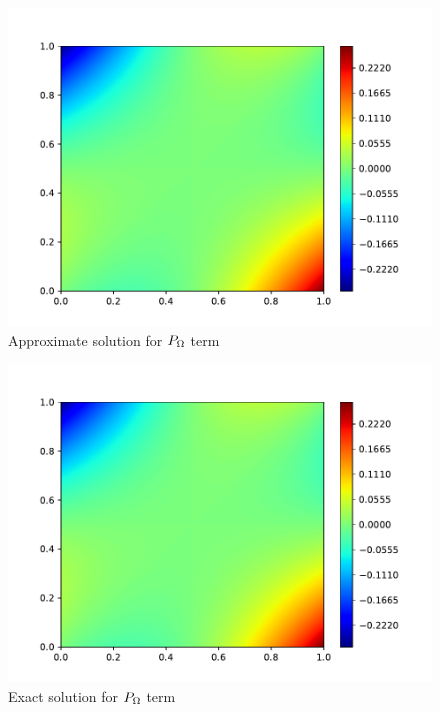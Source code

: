\begin{figure}[H]
    \includegraphics[height=0.4\textheight]{media/enstrophy-transport-terms/SGS-prod-approx.pdf}
    \caption{Approximate solution for $P_{\Omega}$ term}
    \label{fig:p-approx}
\end{figure}
\begin{figure}[H]
    \includegraphics[height=0.4\textheight]{media/enstrophy-transport-terms/SGS-prod-exact.pdf}
    \caption{Exact solution for $P_{\Omega}$ term}
    \label{fig:p-exact}
\end{figure}
